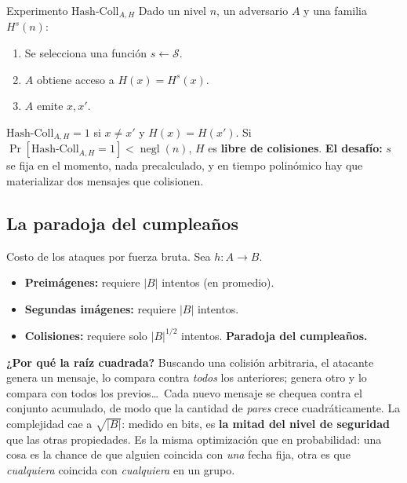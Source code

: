 \documentclass[11pt,a4paper]{article}
\newcommand{\Sset}{\mathcal{S}}
\DeclareMathOperator{\negl}{negl}
\begin{document}
\begin{defbox}{Experimento $\mathrm{Hash\text{-}Coll}_{A,H}$}
Dado un nivel $n$, un adversario $A$ y una familia $H^s(n)$:
\begin{enumerate}[leftmargin=1.6em,itemsep=1pt]
  \item Se selecciona una función $s\leftarrow\Sset$.
  \item $A$ obtiene acceso a $H(x)=H^s(x)$.
  \item $A$ emite $x,x'$.
\end{enumerate}
$\mathrm{Hash\text{-}Coll}_{A,H}=1$ si $x\neq x'$ y $H(x)=H(x')$. Si
$\Pr[\mathrm{Hash\text{-}Coll}_{A,H}=1]<\negl(n)$, $H$ es \textbf{libre de colisiones}.
\textbf{El desafío:} $s$ se fija en el momento, nada precalculado, y en tiempo polinómico hay
que materializar dos mensajes que colisionen.
\end{defbox}

\subsection{La paradoja del cumpleaños}
\begin{defbox}{Costo de los ataques por fuerza bruta. Sea $h:A\to B$.}
\begin{itemize}[leftmargin=1.4em,itemsep=2pt]
  \item \textbf{Preimágenes:} requiere $|B|$ intentos (en promedio).
  \item \textbf{Segundas imágenes:} requiere $|B|$ intentos.
  \item \textbf{Colisiones:} requiere solo $|B|^{1/2}$ intentos. \textbf{Paradoja del
        cumpleaños.}
\end{itemize}
\end{defbox}

\textbf{¿Por qué la raíz cuadrada?} Buscando una colisión arbitraria, el atacante genera un
mensaje, lo compara contra \emph{todos} los anteriores; genera otro y lo compara con todos
los previos\ldots\ Cada nuevo mensaje se chequea contra el conjunto acumulado, de modo que la
cantidad de \emph{pares} crece cuadráticamente. La complejidad cae a
$\sqrt{|B|}$: medido en bits, es \textbf{la mitad del nivel de seguridad} que las otras
propiedades. Es la misma optimización que en probabilidad: una cosa es la chance de que
alguien coincida con \emph{una} fecha fija, otra es que \emph{cualquiera} coincida con
\emph{cualquiera} en un grupo.
\end{document}

